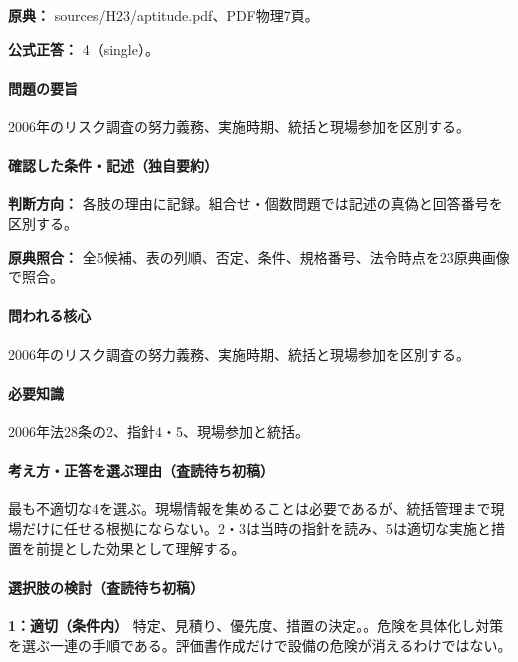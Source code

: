 \noindent\textbf{原典：} sources/H23/aptitude.pdf、PDF物理7頁。

\textbf{公式正答：} 4（single）。

\paragraph{問題の要旨} 2006年のリスク調査の努力義務、実施時期、統括と現場参加を区別する。

\paragraph{確認した条件・記述（独自要約）}\mbox{}\par

\noindent\textbf{判断方向：} 各肢の理由に記録。組合せ・個数問題では記述の真偽と回答番号を区別する。\par

\noindent\textbf{原典照合：} 全5候補、表の列順、否定、条件、規格番号、法令時点を23原典画像で照合。\par

\paragraph{問われる核心} 2006年のリスク調査の努力義務、実施時期、統括と現場参加を区別する。

\paragraph{必要知識} 2006年法28条の2、指針4・5、現場参加と統括。

\paragraph{考え方・正答を選ぶ理由（査読待ち初稿）} 最も不適切な4を選ぶ。現場情報を集めることは必要であるが、統括管理まで現場だけに任せる根拠にならない。2・3は当時の指針を読み、5は適切な実施と措置を前提とした効果として理解する。

\paragraph{選択肢の検討（査読待ち初稿）}\mbox{}\par

\noindent\textbf{1：適切（条件内）} 特定、見積り、優先度、措置の決定。。危険を具体化し対策を選ぶ一連の手順である。評価書作成だけで設備の危険が消えるわけではない。\par

